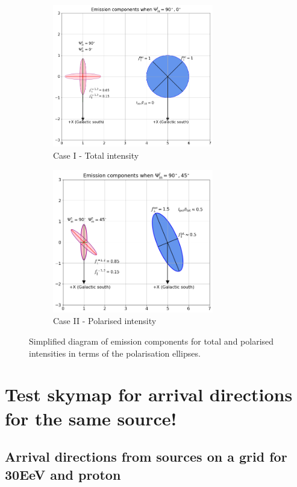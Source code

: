 \documentclass[12pt, a4 paper]{article}
\begin{document}
\begin{figure}[h!]
     \centering
     \begin{subfigure}{0.4\textwidth}
         \centering
         \includegraphics[width = 7cm]{Images/Total_intensity_Ellipses_circles_emissions.png}
         \caption{Case I - Total intensity}
         \label{fig_tot_intensity}
     \end{subfigure}
  \hfill
    \begin{subfigure}{0.4\textwidth}
         \centering
         \includegraphics[width = 7cm]{Images/Pol_intensity_Ellipses_circles_emissions.png}
         \caption{Case II - Polarised intensity}
         \label{fig_pol_intensity}
     \end{subfigure}
     \hfill
    \caption{Simplified diagram of emission components for total and polarised intensities in terms of the polarisation ellipses.}
\end{figure}


\section{Test skymap for arrival directions for the same source!}

\subsection{Arrival directions from sources on a grid for 30EeV and proton}
\end{document}
